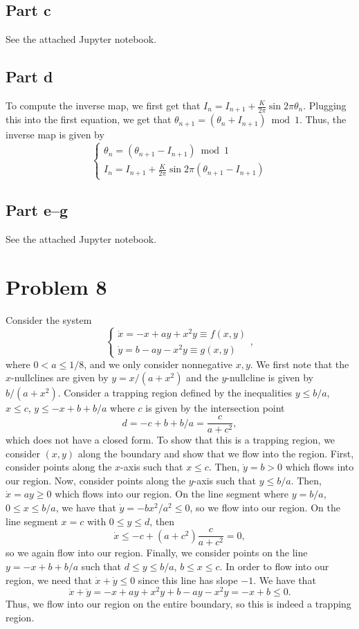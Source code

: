 \documentclass{article}
\begin{document}
\subsection{Part c}
See the attached Jupyter notebook.

\subsection{Part d}
To compute the inverse map, we first get that $I_n=I_{n+1}+\frac{K}{2 \pi} \sin 2 \pi \theta_{n}$. Plugging this into the first equation, we get that $\theta_{n+1}=(\theta_n+I_{n+1})\bmod1$. Thus,
the inverse map is given by
\begin{equation*}
	\left\{\begin{array}{l}
		\theta_{n}=(\theta_{n+1}-I_{n+1}) \bmod 1 \\
		I_n=I_{n+1}+\frac{K}{2 \pi} \sin 2 \pi (\theta_{n+1}-I_{n+1})
	\end{array}\right.
\end{equation*}

\subsection{Part e--g}
See the attached Jupyter notebook.

\section{Problem 8}
Consider the system 
\begin{equation*}
	\left\{\begin{array}{l}
		\dot{x}=-x+a y+x^{2} y \equiv f(x, y) \\
		\dot{y}=b-a y-x^{2} y \equiv g(x, y)
	\end{array}\right.,
\end{equation*}
where $0 < a \le 1/8$, and we only consider nonnegative $x,y$. We first note that the $x$-nullclines are given by $y=x/(a+x^2)$ and the $y$-nullcline is given by $b/(a+x^2)$. Consider a trapping region defined by the inequalities $y\leq b/a$, $x\leq c$, $y\leq-x+b+b/a$ where $c$ is given by the intersection point 
\[
d=-c+b+b/a=\frac{c}{a+c^2},
\]
which does not have a closed form. To show that this is a trapping region, we consider $(x,y)$ along the boundary and show that we flow into the region. First, consider points along the $x$-axis such that $x\leq c$. Then, $\dot y=b>0$ which flows into our region. Now, consider points along the $y$-axis such that $y\leq b/a$. Then, $\dot x=ay\geq0$ which flows into our region. On the line segment where $y=b/a$, $0\leq x\leq b/a$, we have that $\dot y=-bx^2/a^2\leq0$, so we flow into our region. On the line segment $x=c$ with $0\leq y\leq d$, then
\[
\dot{x}\leq-c+(a+c^2)\frac{c}{a+c^2}=0,
\]
so we again flow into our region. Finally, we consider points on the line $y=-x+b+b/a$ such that $d\leq y\leq b/a$, $b\leq x\leq c$. In order to flow into our region, we need that $\dot x+\dot y\leq0$ since this line has slope $-1$. We have that
\[
\dot x+\dot y=-x+a y+x^{2} y+b-a y-x^{2} y=-x+b\leq0.
\]
Thus, we flow into our region on the entire boundary, so this is indeed a trapping region.
\end{document}
